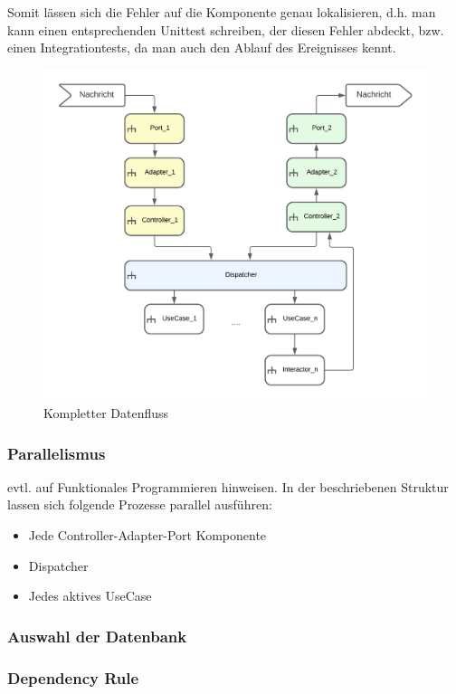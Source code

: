 \documentclass{article}
\begin{document}
    Somit lässen sich die Fehler auf die Komponente genau lokalisieren, d.h. man kann einen entsprechenden Unittest schreiben, 
    der diesen Fehler abdeckt, bzw. einen Integrationtests, da man auch den Ablauf des Ereignisses kennt.
    
    \begin{figure}[H]
        \centering
        \includegraphics[width=12cm]{./images/FullDataFlow.png}
         \caption[Kompletter Datenfluss]{Kompletter Datenfluss \footnotemark}
         \label{fig:FullDataFlow}
    \end{figure}

    \newpage
    \subsubsection{Parallelismus}
    evtl. auf Funktionales Programmieren hinweisen.
    In der beschriebenen Struktur lassen sich folgende Prozesse parallel ausführen:
    \begin{itemize}
        \item Jede Controller-Adapter-Port Komponente
        \item Dispatcher
        \item Jedes aktives UseCase
    \end{itemize}

    \subsubsection{Auswahl der Datenbank}
    \subsubsection{Dependency Rule}
\end{document}
